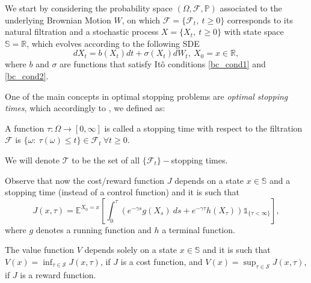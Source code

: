  
 We start by considering the probability space $(\Omega,\mathcal{F}, \mathds{P})$ associated to the underlying Brownian Motion $W$, on which $\mathcal{F}=\{\mathcal{F}_t, \ t\geq0 \}$ corresponds to its natural filtration and a stochastic process $X=\{ X_t, \ t \geq0 \}$ with state space $\mathds{S}=\mathds{R}$, which evolves according to the following SDE
 \begin{equation}
 d X_t=b(X_t)dt + \sigma (X_t)dW_t, \ X_0=x\in \mathds{R},
 \label{bc_cp2}
 \end{equation} 
 where $b$ and $\sigma$ are functions that satisfy Itô conditions \eqref{bc_cond1} and \eqref{bc_cond2}.
 
 One of the main concepts in optimal stopping problems are \textit{optimal stopping times}, which accordingly to \cite{oksendal:book}, we defined as:
 \begin{defi}
	 A function $\tau:\Omega \rightarrow [0,\infty]$ is called a stopping time with respect to the filtration $\mathcal{F}$ is $\{ \omega: \ \tau(\omega)\leq t\} \in \mathcal{F}_t \ \forall t\geq0$.
 \end{defi}
 We will denote $\mathcal{T}$ to be the set of all $\{\mathcal{F}_t\}-$stopping times.
 

 Observe that now the cost/reward function $J$ depends on a state $x\in\mathds{S}$ and a stopping time (instead of a control function) and it is such that
 \begin{equation}
 J(x,\tau)=\mathds{E}^{X_0=x}\left[ \int^\tau_0 \left(e^{-\gamma s} g(X_s) \ ds +e^{-\gamma \tau}h(X_\tau)\right) \mathds{1}_{ \{\tau< \infty \}} \right]  ,
 \label{bc2_J}
 \end{equation}
 where $g$ denotes a running function and $h$ a terminal function.
 
The value function $V$ depends solely on a state $x\in \mathds{S}$ and it is such that
$V(x)=\inf_{\tau \in \mathcal{S}} J(x, \tau)$, if $J$ is a cost function, and $V(x)=\sup_{\tau \in \mathcal{S}} J(x, \tau)$, if $J$ is a reward function.

